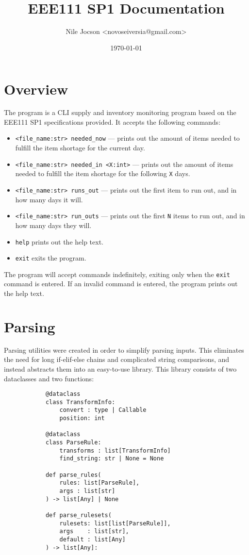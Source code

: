 \documentclass{article}
\title{EEE111 SP1 Documentation}
\author{Nile Jocson \textless{novoseiversia@gmail.com}\textgreater}
\date{\today}
\begin{document}
	\maketitle
		\pagebreak



	\tableofcontents
		\pagebreak



	\section{Overview}\label{overview}
		The program is a CLI supply and inventory monitoring program based on
		the EEE111 SP1 specifications provided. It accepts the following commands:

		\begin{itemize}
			\item \verb|<file_name:str> needed_now| --- prints out the amount of items
			needed to fulfill the item shortage for the current day.
			\item \verb|<file_name:str> needed_in <X:int>| --- prints out the amount of items
			needed to fulfill the item shortage for the following \verb|X| days.
			\item \verb|<file_name:str> runs_out| --- prints out the first item to run out, and
			in how many days it will.
			\item \verb|<file_name:str> run_outs| --- prints out the first \verb|N| items to run
			out, and in how many days they will.
			\item \verb|help| prints out the help text.
			\item \verb|exit| exits the program.
		\end{itemize}

		The program will accept commands indefinitely, exiting only when the \verb|exit| command is
		entered. If an invalid command is entered, the program prints out the help text.

		\pagebreak

	\section{Parsing}
		Parsing utilities were created in order to simplify parsing inputs. This eliminates the
		need for long if-elif-else chains and complicated string comparisons, and instead
		abstracts them into an easy-to-use library. This library consists of two dataclasses and
		two functions:

		\begin{verbatim}
			@dataclass
			class TransformInfo:
				convert : type | Callable
				position: int

			@dataclass
			class ParseRule:
				transforms : list[TransformInfo]
				find_string: str | None = None

			def parse_rules(
				rules: list[ParseRule],
				args : list[str]
			) -> list[Any] | None

			def parse_rulesets(
				rulesets: list[list[ParseRule]],
				args    : list[str],
				default : list[Any]
			) -> list[Any]:
		\end{verbatim}
\end{document}
